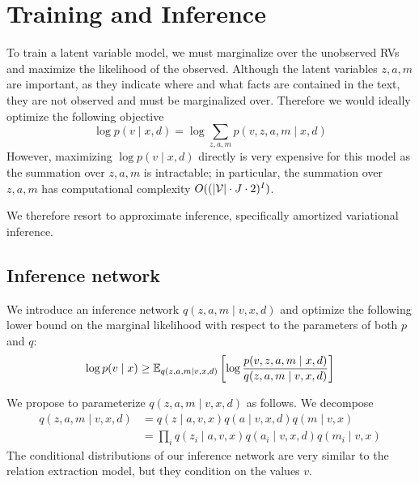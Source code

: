 \documentclass[12pt]{article}
\begin{document}
\section{Training and Inference}
To train a latent variable model, we must marginalize over the unobserved RVs
and maximize the likelihood of the observed.
Although the latent variables $z,a,m$ are important, as they indicate
where and what facts are contained in the text, they are not observed
and must be marginalized over.
Therefore we would ideally optimize the following objective
\begin{equation}
\log p(v \mid x,d) = \log \sum_{z,a,m} p(v,z,a,m \mid x,d)
\end{equation}
However, maximizing $\log p(v \mid x,d)$ directly is very expensive for this model
as the summation over $z,a,m$ is intractable;
in particular,
the summation over $z,a,m$ has computational complexity $O((|\mathcal{V}|\cdot J\cdot 2)^{I})$.

We therefore resort to approximate inference,
specifically amortized variational inference.

\subsection{Inference network}
We introduce an inference network $q(z,a,m\mid v,x,d)$
and optimize the following lower bound on the marginal likelihood
with respect to the parameters of both $p$ and $q$:
\begin{equation}
\label{eqn:lowerbound}
\log p(v\mid x) \geq
\mathbb{E}_{q(z,a,m\mid v,x,d)}\left[\log \frac{p(v,z,a,m\mid x,d)}{q(z,a,m\mid v,x,d)}\right]
\end{equation}

We propose to parameterize $q(z,a,m\mid v,x,d)$ as follows.
We decompose 
\begin{equation}
\label{eqn:elbo}
\begin{aligned}
q(z,a,m\mid v,x,d) &= q(z \mid a,v,x)q(a\mid v,x,d)q(m \mid v,x)\\
&= \prod_i q(z_i \mid a,v,x)q(a_i \mid v,x,d)q(m_i \mid v,x)
\end{aligned}
\end{equation}
The conditional distributions of our inference network
are very similar to the relation extraction model,
but they condition on the values $v$.
\end{document}
